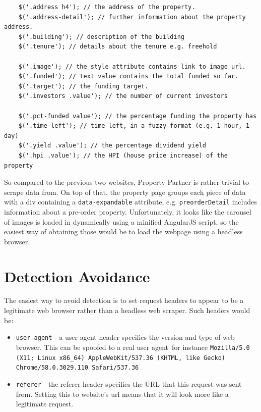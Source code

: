 \documentclass{article}
\begin{document}
\begin{verbatim}
    $('.address h4'); // the address of the property.
    $('.address-detail'); // further information about the property address.
    $('.building'); // description of the building
    $('.tenure'); // details about the tenure e.g. freehold

    $('.image'); // the style attribute contains link to image url.
    $('.funded'); // text value contains the total funded so far.
    $('.target'); // the funding target.
    $('.investors .value'); // the number of current investors
    
    $('.pct-funded value'); // the percentage funding the property has
    $('.time-left'); // time left, in a fuzzy format (e.g. 1 hour, 1 day)
    $('.yield .value'); // the percentage dividend yield
    $('.hpi .value'); // the HPI (house price increase) of the property
\end{verbatim}

So compared to the previous two websites, Property Partner is rather trivial to
scrape data from. On top of that, the property page groups each piece of data
with a div containing a \texttt{data-expandable} attribute, e.g.
\texttt{preorderDetail} includes information about a pre-order property.
Unfortunately, it looks like the carousel of images is loaded in dynamically
using a minified AngularJS script, so the easiest way of obtaining those would
be to load the webpage using a headless browser.

\section*{Detection Avoidance}
The easiest way to avoid detection is to set request headers to appear to be a
legitimate web browser rather than a headless web scraper. Such headers would
be:
\begin{itemize}
    \item \texttt{user-agent} - a user-agent header specifies the version and
        type of web browser. This can be spoofed to a real user
        agent\textemdash~for instance \texttt{Mozilla/5.0 (X11; Linux x86\_64)
            AppleWebKit/537.36 (KHTML, like Gecko) Chrome/58.0.3029.110
            Safari/537.36}
    \item \texttt{referer} - the referer header specifies the URL that this
        request was sent from. Setting this to website's url means that it
        will look more like a legitimate request.
\end{itemize}
\end{document}
